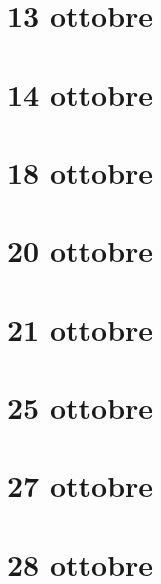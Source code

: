 \documentclass[class=article]{standalone}
\begin{document}
\newpage
\section{13 ottobre}


\newpage
\section{14 ottobre}


\newpage
\section{18 ottobre}


\newpage
\section{20 ottobre}


\newpage
\section{21 ottobre}


\newpage
\section{25 ottobre}


\newpage
\section{27 ottobre}


\newpage
\section{28 ottobre}
\end{document}
